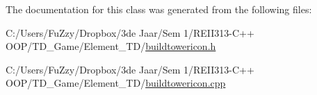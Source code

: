 The documentation for this class was generated from the following files\+:\begin{DoxyCompactItemize}
\item 
C\+:/\+Users/\+Fu\+Zzy/\+Dropbox/3de Jaar/\+Sem 1/\+R\+E\+I\+I313-\/\+C++ O\+O\+P/\+T\+D\+\_\+\+Game/\+Element\+\_\+\+T\+D/\hyperlink{buildtowericon_8h}{buildtowericon.\+h}\item 
C\+:/\+Users/\+Fu\+Zzy/\+Dropbox/3de Jaar/\+Sem 1/\+R\+E\+I\+I313-\/\+C++ O\+O\+P/\+T\+D\+\_\+\+Game/\+Element\+\_\+\+T\+D/\hyperlink{buildtowericon_8cpp}{buildtowericon.\+cpp}\end{DoxyCompactItemize}
